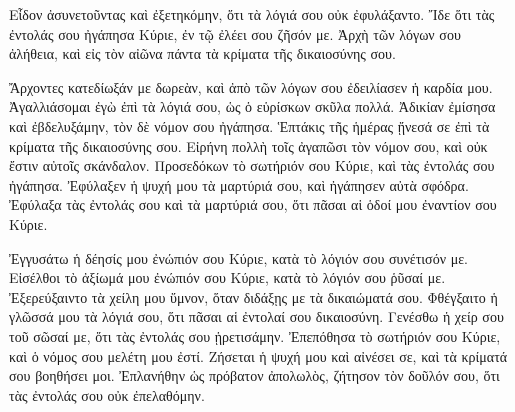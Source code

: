 {Εἶδον ἀσυνετοῦντας καὶ ἐξετηκόμην, ὅτι τὰ λόγιά σου οὐκ ἐφυλάξαντο.
Ἴδε ὅτι τὰς ἐντολάς σου ἠγάπησα Κύριε, ἐν τῷ ἐλέει σου ζῆσόν με.
Ἀρχὴ τῶν λόγων σου ἀλήθεια, καὶ εἰς τὸν αἰῶνα πάντα τὰ κρίματα τῆς δικαιοσύνης σου.
\par }{\PP {}Ἄρχοντες κατεδίωξάν με δωρεὰν, καὶ ἀπὸ τῶν λόγων σου ἐδειλίασεν ἡ καρδία μου.
Ἀγαλλιάσομαι ἐγὼ ἐπὶ τὰ λόγιά σου, ὡς ὁ εὑρίσκων σκῦλα πολλά.
Ἀδικίαν ἐμίσησα καὶ ἐβδελυξάμην, τὸν δὲ νόμον σου ἠγάπησα.
Ἑπτάκις τῆς ἡμέρας ᾔνεσά σε ἐπὶ τὰ κρίματα τῆς δικαιοσύνης σου.
Εἰρήνη πολλὴ τοῖς ἀγαπῶσι τὸν νόμον σου, καὶ οὐκ ἔστιν αὐτοῖς σκάνδαλον.
Προσεδόκων τὸ σωτήριόν σου Κύριε, καὶ τὰς ἐντολάς σου ἠγάπησα.
Ἐφύλαξεν ἡ ψυχή μου τὰ μαρτύριά σου, καὶ ἠγάπησεν αὐτὰ σφόδρα.
Ἐφύλαξα τὰς ἐντολάς σου καὶ τὰ μαρτύριά σου, ὅτι πᾶσαι αἱ ὁδοί μου ἐναντίον σου Κύριε.
\par }{\PP {}Ἐγγυσάτω ἡ δέησίς μου ἐνώπιόν σου Κύριε, κατὰ τὸ λόγιόν σου συνέτισόν με.
Εἰσέλθοι τὸ ἀξίωμά μου ἐνώπιόν σου Κύριε, κατὰ τὸ λόγιόν σου ῥῦσαί με.
Ἐξερεύξαιντο τὰ χείλη μου ὕμνον, ὅταν διδάξῃς με τὰ δικαιώματά σου.
Φθέγξαιτο ἡ γλῶσσά μου τὰ λόγιά σου, ὅτι πᾶσαι αἱ ἐντολαί σου δικαιοσύνη.
Γενέσθω ἡ χείρ σου τοῦ σῶσαί με, ὅτι τὰς ἐντολάς σου ᾑρετισάμην.
Ἐπεπόθησα τὸ σωτήριόν σου Κύριε, καὶ ὁ νόμος σου μελέτη μου ἐστί.
Ζήσεται ἡ ψυχή μου καὶ αἰνέσει σε, καὶ τὰ κρίματά σου βοηθήσει μοι.
Ἐπλανήθην ὡς πρόβατον ἀπολωλὸς, ζήτησον τὸν δοῦλόν σου, ὅτι τὰς ἐντολάς σου οὐκ ἐπελαθόμην.

\par }
